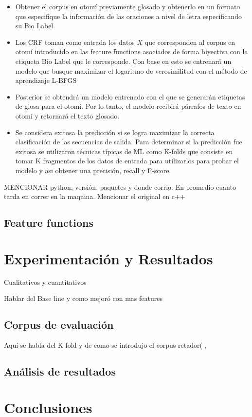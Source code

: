 \documentclass[letterpaper,12pt,oneside]{book}
\begin{document}
\begin{itemize}
	\item Obtener el corpus en otomí previamente glosado y obtenerlo en un
	formato que especifique la información de las oraciones a nivel
	de letra especificando su Bio Label.
	\item Los CRF toman como entrada los datos $X$ que corresponden al
	corpus en otomí introducido en las feature functions asociados
	de forma biyectiva con la etiqueta Bio Label que le corresponde.
	Con base en esto se entrenará un modelo que busque maximizar el
	logaritmo de verosimilitud con el método de aprendizaje L-BFGS
	\item Posterior se obtendrá un modelo entrenado con el que se generarán
	etiquetas de glosa para el otomí. Por lo tanto, el modelo
	recibirá párrafos de texto en otomí y retornará el texto
	glosado.
	\item Se considera exitosa la predicción si se logra maximizar la
	correcta clasificación de las secuencias de salida. Para
	determinar si la predicción fue exitosa se utilizaron técnicas
	típicas de ML como K-folds que consiste en tomar K fragmentos
	de los datos de entrada para utilizarlos para probar el modelo
	y asi obtener una precisión, recall y F-score.
\end{itemize}



MENCIONAR python, versión, paquetes y donde corrio. En promedio cuanto tarda
en correr en la maquina. Mencionar el original en c++

\section{Feature functions}

\chapter{Experimentación y Resultados}

Cualitativos y cuantitativos

Hablar del Base line y como mejoró con mas features

\section{Corpus de evaluación}

Aquí se habla del K fold y de como se introdujo el corpus retador( ,

\citet{singh2005comparison}

\section{Análisis de resultados}

\chapter{Conclusiones}


	
\end{document}
